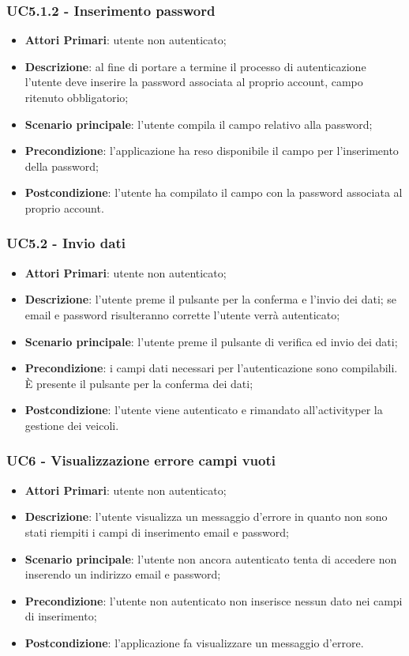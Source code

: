 \subsubsection{UC5.1.2 - Inserimento password}
\begin{itemize}
	\item \textbf{Attori Primari}: utente non autenticato;
	\item \textbf{Descrizione}: al fine di portare a termine il processo di autenticazione l'utente deve inserire la password associata al proprio account, campo ritenuto obbligatorio;
	\item \textbf{Scenario principale}: l'utente compila il campo relativo alla password;	
	\item \textbf{Precondizione}: l'applicazione ha reso disponibile il campo per l'inserimento della password;
	\item \textbf{Postcondizione}: l'utente ha compilato il campo con la password associata al proprio account.
\end{itemize}

\subsubsection{UC5.2 - Invio dati}
\begin{itemize}
	\item \textbf{Attori Primari}: utente non autenticato;
	\item \textbf{Descrizione}: l'utente preme il pulsante per la conferma e l'invio dei dati; se email e password risulteranno corrette l'utente verrà autenticato;
	\item \textbf{Scenario principale}: l'utente preme il pulsante di verifica ed invio dei dati;	
	\item \textbf{Precondizione}: i campi dati necessari per l'autenticazione sono compilabili. È presente il pulsante per la conferma dei dati;
	\item \textbf{Postcondizione}: l'utente viene autenticato e rimandato all'activity\glosp per la gestione dei veicoli.
\end{itemize}

\subsubsection{UC6 - Visualizzazione errore campi vuoti}
\begin{itemize}
	\item \textbf{Attori Primari}: utente non autenticato;
	\item \textbf{Descrizione}: l'utente visualizza un messaggio d'errore in quanto non sono stati riempiti i campi di inserimento email e password;
	\item \textbf{Scenario principale}: l'utente non ancora autenticato tenta di accedere non inserendo un indirizzo email e password;	
	\item \textbf{Precondizione}: l'utente non autenticato non inserisce nessun dato nei campi di inserimento;
	\item \textbf{Postcondizione}: l'applicazione fa visualizzare un messaggio d'errore.
\end{itemize}
